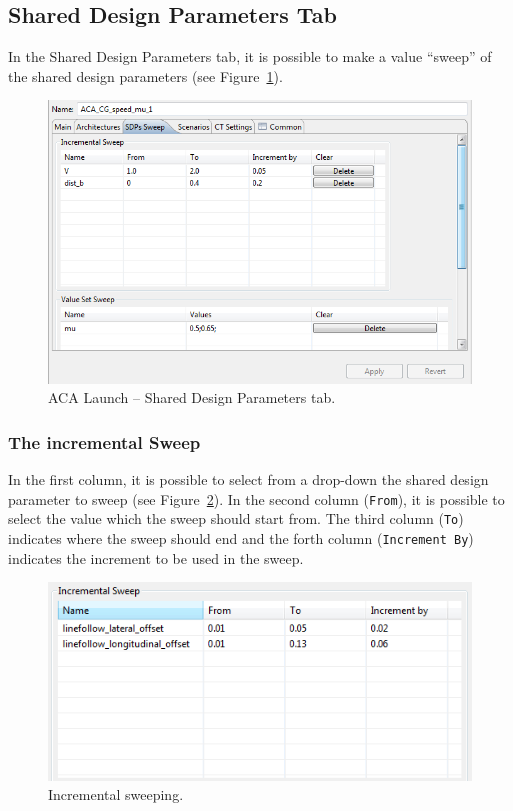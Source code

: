 \documentclass{crescendorepchap}
\begin{document}
\subsection{Shared Design Parameters Tab}

In the Shared Design Parameters tab, it is possible to make a value
``sweep'' of the shared design parameters (see Figure~\ref{fig:SDPsSweep}).

\begin{figure}[htbp]
\centering
\includegraphics[width=.6\textwidth]{images/SDPsSweep.png}
\caption{ACA Launch -- Shared Design Parameters tab.\label{fig:SDPsSweep}}
\end{figure}

\subsubsection{The incremental Sweep}

In the first column, it is possible to select from a drop-down the shared
design parameter to sweep (see Figure~\ref{fig:IncrementalSweep}). 
In the second column (\texttt{From}), it is possible
to select the value which the sweep should start from. The third column
(\texttt{To}) indicates where the sweep should end and the forth column
(\texttt{Increment By}) indicates the increment to be used in the sweep.

\begin{figure}[htbp]
\centering
\includegraphics[width=.6\textwidth]{images/IncrementalSweep.png}
\caption{Incremental sweeping.\label{fig:IncrementalSweep}}
\end{figure}
\end{document}
